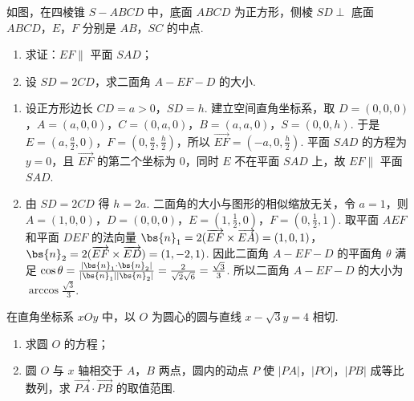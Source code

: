 \begin{problem}
如图，在四棱锥 \(S-ABCD\) 中，底面 \(ABCD\) 为正方形，侧棱 \(SD\perp\) 底面 \(ABCD\)，\(E\)，\(F\) 分别是 \(AB\)，\(SC\) 的中点.

\begin{enumerate}
\item 求证：\(EF\parallel\) 平面 \(SAD\)；
\item 设 \(SD=2CD\)，求二面角 \(A-EF-D\) 的大小.
\end{enumerate}

\end{problem}

\begin{solution}
\begin{enumerate}
\item 设正方形边长 \(CD=a>0\)，\(SD=h\). 建立空间直角坐标系，取 \(D=(0,0,0)\)，\(A=(a,0,0)\)，\(C=(0,a,0)\)，\(B=(a,a,0)\)，\(S=(0,0,h)\). 于是 \(E=\left(a,\frac{a}{2},0\right)\)，\(F=\left(0,\frac{a}{2},\frac{h}{2}\right)\)，所以 \(\overrightarrow{EF}=\left(-a,0,\frac{h}{2}\right)\). 平面 \(SAD\) 的方程为 \(y=0\)，且 \(\overrightarrow{EF}\) 的第二个坐标为 \(0\)，同时 \(E\) 不在平面 \(SAD\) 上，故 \(EF\parallel\) 平面 \(SAD\).
\item 由 \(SD=2CD\) 得 \(h=2a\). 二面角的大小与图形的相似缩放无关，令 \(a=1\)，则 \(A=(1,0,0)\)，\(D=(0,0,0)\)，\(E=\left(1,\frac12,0\right)\)，\(F=\left(0,\frac12,1\right)\). 取平面 \(AEF\) 和平面 \(DEF\) 的法向量 \(\bs{n}_1=2(\overrightarrow{EF}\times\overrightarrow{EA})=(1,0,1)\)，\(\bs{n}_2=2(\overrightarrow{EF}\times\overrightarrow{ED})=(1,-2,1)\). 因此二面角 \(A-EF-D\) 的平面角 \(\theta\) 满足 \(\cos\theta=\frac{|\bs{n}_1\cdot\bs{n}_2|}{|\bs{n}_1||\bs{n}_2|}=\frac{2}{\sqrt{2}\sqrt{6}}=\frac{\sqrt{3}}{3}\). 所以二面角 \(A-EF-D\) 的大小为 \(\arccos\frac{\sqrt{3}}{3}\).
\end{enumerate}
\end{solution}

\begin{problem}
在直角坐标系 \(xOy\) 中，以 \(O\) 为圆心的圆与直线 \(x-\sqrt{3}y=4\) 相切.

\begin{enumerate}
\item 求圆 \(O\) 的方程；
\item 圆 \(O\) 与 \(x\) 轴相交于 \(A\)，\(B\) 两点，圆内的动点 \(P\) 使 \(|PA|\)，\(|PO|\)，\(|PB|\) 成等比数列，求 \(\overrightarrow{PA}\cdot\overrightarrow{PB}\) 的取值范围.
\end{enumerate}
\end{problem}

